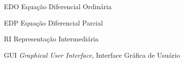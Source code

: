 \documentclass[
	12pt,				%
	openright,			%
	oneside,			%
	a4paper,			%
	main=brazil,
	english,			%
	]{ufsj-abntex2}
\begin{document}
\frenchspacing 

\pretextual

\imprimircapa

\imprimirfolhaderosto




\listoffigures*
\cleardoublepage


\begin{siglas}
  \item[EDO] Equação Diferencial Ordinária
  \item[EDP] Equação Diferencial Parcial
  \item[RI] Representação Intermediária
  \item[GUI] \textit{Graphical User Interface}, Interface Gráfica de Usuário
\end{siglas}
\end{document}

